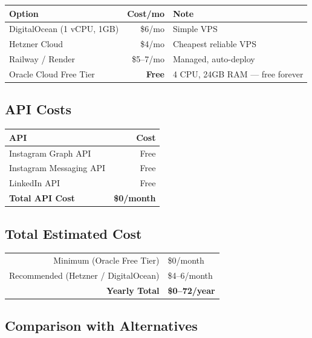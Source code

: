 \documentclass[12pt,a4paper]{article}
\begin{document}
\begin{tabularx}{\textwidth}{Xrl}
\toprule
\textbf{Option} & \textbf{Cost/mo} & \textbf{Note} \\
\midrule
DigitalOcean (1 vCPU, 1GB) & \$6/mo & Simple VPS \\
Hetzner Cloud & \$4/mo & Cheapest reliable VPS \\
Railway / Render & \$5--7/mo & Managed, auto-deploy \\
Oracle Cloud Free Tier & \textbf{Free} & 4 CPU, 24GB RAM --- free forever \\
\bottomrule
\end{tabularx}

\subsection{API Costs}

\begin{tabularx}{\textwidth}{Xr}
\toprule
\textbf{API} & \textbf{Cost} \\
\midrule
Instagram Graph API & Free \\
Instagram Messaging API & Free \\
LinkedIn API & Free \\
\midrule
\textbf{Total API Cost} & \textbf{\$0/month} \\
\bottomrule
\end{tabularx}

\subsection{Total Estimated Cost}

\begin{tcolorbox}[colback=blue!3, colframe=pri, boxrule=0.4pt]
\begin{center}
\renewcommand{\arraystretch}{1.4}
\begin{tabular}{rl}
Minimum (Oracle Free Tier) & \$0/month \\
Recommended (Hetzner / DigitalOcean) & \$4--6/month \\
\hline
\textbf{Yearly Total} & \textbf{\$0--72/year} \\
\end{tabular}
\end{center}
\end{tcolorbox}

\subsection{Comparison with Alternatives}
\end{document}

